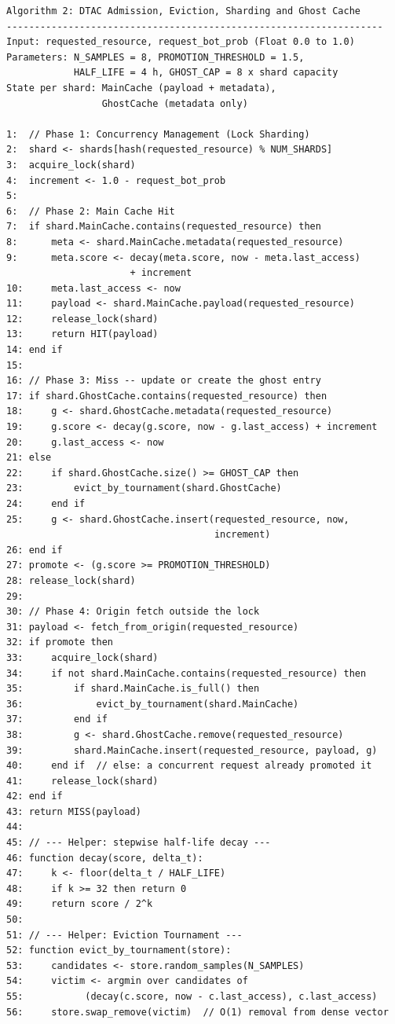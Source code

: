 \begin{verbatim}
Algorithm 2: DTAC Admission, Eviction, Sharding and Ghost Cache
-------------------------------------------------------------------
Input: requested_resource, request_bot_prob (Float 0.0 to 1.0)
Parameters: N_SAMPLES = 8, PROMOTION_THRESHOLD = 1.5,
            HALF_LIFE = 4 h, GHOST_CAP = 8 x shard capacity
State per shard: MainCache (payload + metadata),
                 GhostCache (metadata only)

1:  // Phase 1: Concurrency Management (Lock Sharding)
2:  shard <- shards[hash(requested_resource) % NUM_SHARDS]
3:  acquire_lock(shard)
4:  increment <- 1.0 - request_bot_prob
5:
6:  // Phase 2: Main Cache Hit
7:  if shard.MainCache.contains(requested_resource) then
8:      meta <- shard.MainCache.metadata(requested_resource)
9:      meta.score <- decay(meta.score, now - meta.last_access)
                      + increment
10:     meta.last_access <- now
11:     payload <- shard.MainCache.payload(requested_resource)
12:     release_lock(shard)
13:     return HIT(payload)
14: end if
15:
16: // Phase 3: Miss -- update or create the ghost entry
17: if shard.GhostCache.contains(requested_resource) then
18:     g <- shard.GhostCache.metadata(requested_resource)
19:     g.score <- decay(g.score, now - g.last_access) + increment
20:     g.last_access <- now
21: else
22:     if shard.GhostCache.size() >= GHOST_CAP then
23:         evict_by_tournament(shard.GhostCache)
24:     end if
25:     g <- shard.GhostCache.insert(requested_resource, now,
                                     increment)
26: end if
27: promote <- (g.score >= PROMOTION_THRESHOLD)
28: release_lock(shard)
29:
30: // Phase 4: Origin fetch outside the lock
31: payload <- fetch_from_origin(requested_resource)
32: if promote then
33:     acquire_lock(shard)
34:     if not shard.MainCache.contains(requested_resource) then
35:         if shard.MainCache.is_full() then
36:             evict_by_tournament(shard.MainCache)
37:         end if
38:         g <- shard.GhostCache.remove(requested_resource)
39:         shard.MainCache.insert(requested_resource, payload, g)
40:     end if  // else: a concurrent request already promoted it
41:     release_lock(shard)
42: end if
43: return MISS(payload)
44:
45: // --- Helper: stepwise half-life decay ---
46: function decay(score, delta_t):
47:     k <- floor(delta_t / HALF_LIFE)
48:     if k >= 32 then return 0
49:     return score / 2^k
50:
51: // --- Helper: Eviction Tournament ---
52: function evict_by_tournament(store):
53:     candidates <- store.random_samples(N_SAMPLES)
54:     victim <- argmin over candidates of
55:           (decay(c.score, now - c.last_access), c.last_access)
56:     store.swap_remove(victim)  // O(1) removal from dense vector
\end{verbatim}

